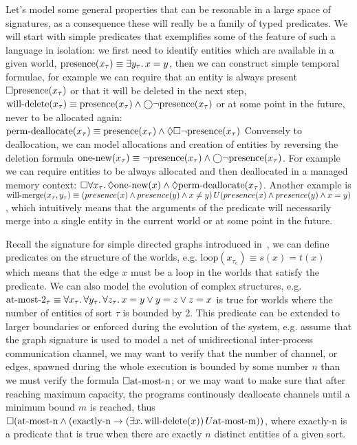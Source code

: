 \begin{example}
  Let's model some general properties that can be resonable in a large space of signatures, as a consequence these will
  really be a family of typed predicates. We will start with simple predicates that exemplifies some of the feature of
  such a language in isolation: we first need to identify entities which are available in a given world,
  $\text{presence}(x_\tau) \equiv \exists {y_\tau} \ldotp {x = y}$, then we can construct simple temporal formulae, for example
  we can require that an entity is always present $\Box{\text{presence}(x_\tau)}$ or that it will be deleted in the next
  step, $\text{will-delete}(x_\tau) \equiv \text{presence}(x_\tau) \land \bigcirc{\neg\text{presence}(x_\tau)}$ or at some
  point in the future, never to be allocated again: $\text{perm-deallocate}(x_\tau) \equiv \text{presence}(x_\tau) \land \Diamond{\Box{\neg\text{presence}(x_\tau)}}$
  Conversely to deallocation, we can model allocations and creation of entities by reversing the deletion formula
  $\text{one-new}(x_\tau) \equiv \neg\text{presence}(x_\tau) \land \bigcirc{\neg\text{presence}(x_\tau)}$. For example
  we can require entities to be always allocated and then deallocated in a managed memory context:
  $\Box{\forall {x_\tau} \ldotp {\Diamond{\text{one-new}(x) \land \Diamond{\text{perm-deallocate}(x_\tau)}}}}$.
  Another example is $\text{will-merge}(x_\tau, y_\tau) \equiv {(presence(x) \land presence(y) \land x \neq y)}\,U {(presence(x) \land presence(y) \land x = y)}$, which intuitively means that the arguments of
  the predicate will necessarily merge into a single entity in the current world or at some point in the future.

  Recall the signature for simple directed graphs introduced in~, we can define predicates on the
  structure of the worlds, e.g. $\text{loop}(x_{\tau_e}) \equiv s(x) = t(x)$ which means that the edge $x$ must be a
  loop in the worlds that satisfy the predicate. We can also model the evolution of complex structures, e.g.
  $\text{at-most-2}_\tau \equiv \forall {x_\tau} \ldotp {\forall {y_\tau} \ldotp {\forall {z_\tau} \ldotp {x = y \lor y = z \lor z = x}}}$ is
  true for worlds where the number of entities of sort $\tau$ is bounded by 2. This predicate can be extended to larger
  boundaries or enforced during the evolution of the system, e.g. assume that the graph signature is used to model a net
  of unidirectional inter-process communication channel, we may want to verify that the number of channel, or edges,
  spawned during the whole execution is bounded by some number $n$ than we must verify the formula
  $\Box{\text{at-most-n}}$; or we may want to make sure that after reaching maximum capacity, the programs
  continously deallocate channels until a minimum bound $m$ is reached, thus $\Box{(\text{at-most-n} \land (\text{exactly-n} \to
  {(\exists {x} \ldotp {\text{will-delete}(x)})}\,U {\text{at-most-m}}))}$, where $\text{exactly-n}$ is a predicate that
  is true when there are exactly $n$ distinct entities of a given sort.
\end{example}
